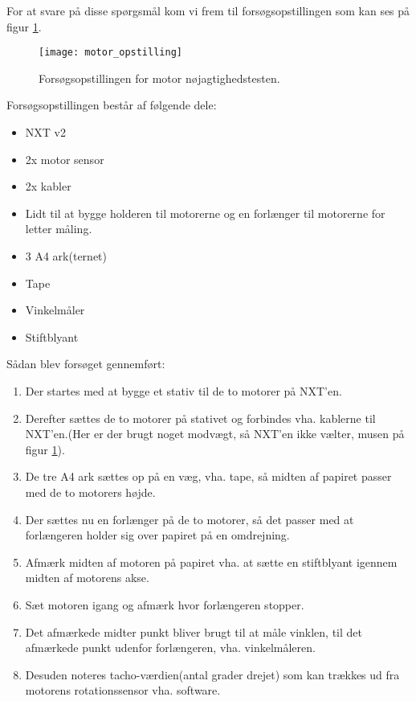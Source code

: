 For at svare på disse spørgsmål kom vi frem til forsøgsopstillingen som kan ses på figur \ref{sensor:motor_sensor_opstilling}.

\begin{figure}[h]
\centering
\texttt{[image: motor\_opstilling]} 	
\caption{Forsøgsopstillingen for motor nøjagtighedstesten.}
\label{sensor:motor_sensor_opstilling}
\end{figure}

Forsøgsopstillingen består af følgende dele:
\begin{itemize}
\item NXT v2
\item 2x \legoms motor sensor
\item 2x \legoms kabler
\item Lidt \lego til at bygge holderen til motorerne og en forlænger til motorerne for letter måling.
\item 3 A4 ark(ternet)
\item Tape
\item Vinkelmåler
\item Stiftblyant
\end{itemize}

Sådan blev forsøget gennemført:

\begin{enumerate}
\item Der startes med at bygge et stativ til de to motorer på NXT'en.
\item Derefter sættes de to motorer på stativet og forbindes vha. kablerne til NXT'en.(Her er der brugt noget modvægt, så NXT'en ikke vælter, musen på figur \ref{sensor:motor_sensor_opstilling}).
\item De tre A4 ark sættes op på en væg, vha. tape, så midten af papiret passer med de to motorers højde.
\item Der sættes nu en forlænger på de to motorer, så det passer med at forlængeren holder sig over papiret på en omdrejning.
\item Afmærk midten af motoren på papiret vha. at sætte en stiftblyant igennem midten af motorens akse.
\item Sæt motoren igang og afmærk hvor forlængeren stopper.
\item Det afmærkede midter punkt bliver brugt til at måle vinklen, til det afmærkede punkt udenfor forlængeren, vha. vinkelmåleren.
\item Desuden noteres tacho-værdien(antal grader drejet) som kan trækkes ud fra motorens rotationssensor vha. software.
\end{enumerate}

